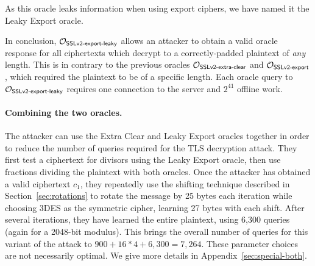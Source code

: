 As this oracle leaks information when using export ciphers,
we have named it the Leaky Export oracle.

In conclusion, $\mathcal{O}_\textsf{SSLv2-export-leaky}$ allows an attacker to obtain a valid oracle response
for all ciphertexts which decrypt to a correctly-padded plaintext of \textit{any} length. This is in contrary to the previous oracles $\mathcal{O}_\textsf{SSLv2-extra-clear}$ and $\mathcal{O}_\textsf{SSLv2-export}$, which required the plaintext to be of a specific length.
Each oracle query to $\mathcal{O}_\textsf{SSLv2-export-leaky}$ requires one connection to the server
and $2^{41}$ offline work.


\paragraph{Combining the two oracles.}
\label{sec:special_drown_summary}

The attacker can use the Extra Clear and Leaky Export oracles
together in order to reduce the number of queries required for the TLS decryption attack.
They first test a \tlsconform ciphertext for divisors using the Leaky Export oracle, then use fractions dividing the plaintext with both oracles.
Once the attacker has obtained a valid \ssltwo ciphertext $c_1$, they repeatedly
use the shifting technique described in Section~\ref{sec:rotations} to rotate
the message by 25 bytes each iteration while choosing 3DES as the
symmetric cipher, learning 27 bytes with each shift.  After several iterations,
they have learned the entire plaintext, using 6,300 queries (again for a 2048-bit
modulus).
This brings the overall number of queries for this variant of the attack to
$ 900 + 16 * 4 + 6,300 = 7,264 $.
These parameter choices are not necessarily optimal.  We give more details in Appendix~\ref{sec:special-both}.
